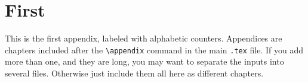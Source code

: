 \chapter{First}
This is the first appendix, labeled with alphabetic counters. Appendices are chapters included after the \verb|\appendix| command in the main \texttt{.tex} file. If you add more than one, and they are long, you may want to separate the inputs into several files. Otherwise just include them all here as different chapters.
